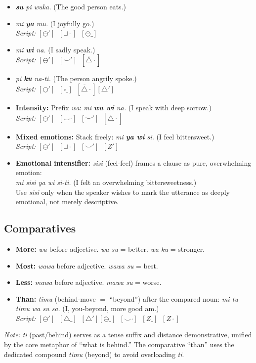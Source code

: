 \documentclass[12pt, a4paper]{article}
\begin{document}
\begin{itemize}
    \item \textit{\textbf{su} pi wuka.} \quad (The good person eats.)
    \item \textit{mi \textbf{ya} mu.} \quad (I joyfully go.) \\
    \textit{Script:} $[\ominus'] \;\; [\sqcup\cdot] \;\; [\ominus\_]$
    \item \textit{mi \textbf{wi} na.} \quad (I sadly speak.) \\
    \textit{Script:} $[\ominus'] \;\; [\smile'] \;\; [\overline{\triangle}\cdot]$
    \item \textit{pi \textbf{ku} na-ti.} \quad (The person angrily spoke.) \\
    \textit{Script:} $[\bigcirc'] \;\; [\square\_] \;\; [\overline{\triangle}\cdot][\triangle']$
    \item \textbf{Intensity:} Prefix \textit{wa}: \quad \textit{mi \textbf{wa wi} na.} \quad (I speak with deep sorrow.) \\
    \textit{Script:} $[\ominus'] \;\; [\smile\cdot] \;\; [\smile'] \;\; [\overline{\triangle}\cdot]$
    \item \textbf{Mixed emotions:} Stack freely: \quad \textit{mi \textbf{ya wi} si.} \quad (I feel bittersweet.) \\
    \textit{Script:} $[\ominus'] \;\; [\sqcup\cdot] \;\; [\smile'] \;\; [Z']$
    \item \textbf{Emotional intensifier:} \textit{sisi} (feel-feel) frames a clause as pure, overwhelming emotion: \\
    \textit{mi sisi ya wi si-ti.} \quad (I felt an overwhelming bittersweetness.) \\
    Use \textit{sisi} only when the speaker wishes to mark the utterance as deeply emotional, not merely descriptive.
\end{itemize}

\subsection{Comparatives}
\begin{itemize}
    \item \textbf{More:} \textit{wa} before adjective. \quad \textit{wa su} = better. \quad \textit{wa ku} = stronger.
    \item \textbf{Most:} \textit{wawa} before adjective. \quad \textit{wawa su} = best.
    \item \textbf{Less:} \textit{mawa} before adjective. \quad \textit{mawa su} = worse.
    \item \textbf{Than:} \textit{timu} (behind-move $=$ ``beyond'') after the compared noun: \quad \textit{mi tu timu wa su sa.} \quad (I, you-beyond, more good am.) \\
    \textit{Script:} $[\ominus'] \;\; [\triangle\_] \;\; [\triangle'][\ominus\_] \;\; [\smile\cdot] \;\; [Z\_] \;\; [Z\cdot]$
\end{itemize}
\textit{Note:} \textit{ti} (past/behind) serves as a tense suffix and distance demonstrative, unified by the core metaphor of ``what is behind.'' The comparative ``than'' uses the dedicated compound \textit{timu} (beyond) to avoid overloading \textit{ti}.
\end{document}
